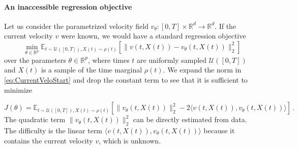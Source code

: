 \documentclass[oneside,11pt]{article}
\theoremstyle{remark}
\begin{document}
\paragraph{An inaccessible regression objective}
Let us  consider the parametrized velocity field $v_{\theta}: [0, T] \times \mathbb{R}^d \to \mathbb{R}^d$.
If the current velocity $v$ were known, we would have a standard regression objective
\begin{equation}\label{eq:CurrentVeloStart}
\min_{\theta \in \mathbb{R}^p} \mathbb{E}_{t \sim \mathcal{U}([0, T]), X(t) \sim \rho(t)}\left[\|v(t, X(t)) - v_{\theta}(t, X(t))\|^2_2\right]
\end{equation}
over the parameters $\theta \in \mathbb{R}^p$, where times $t$ are uniformly sampled  $\mathcal{U}([0, T])$ and $X(t)$ is a sample of the time marginal $\rho(t)$. 
We expand the norm in \eqref{eq:CurrentVeloStart} and drop the constant term to see that it is sufficient to minimize 





\begin{equation}\label{eq:Loss:Intermediate01}
J(\theta) = \mathbb{E}_{t \sim \mathcal{U}([0, T]), X(t) \sim \rho(t)} \left[\|v_{\theta}(t, X(t))\|^2_2 - 2 \langle v(t, X(t)) , v_{\theta}(t, X(t))\rangle\right]\,.
\end{equation}
The quadratic term $\|v_{\theta}(t, X(t))\|^2_2$ can be directly estimated from data. The difficulty is the linear term $\langle v(t, X(t)) , v_{\theta}(t, X(t))\rangle$  because it contains the current velocity $v$, which is unknown. 
\end{document}
